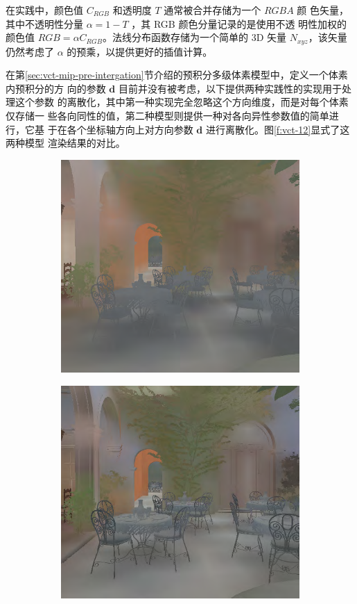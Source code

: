 在实践中，颜色值 $C_{RGB}$ 和透明度 $T$ 通常被合并存储为一个 $RGBA$ 颜 色矢量，其中不透明性分量 $\alpha = 1 − T$ ，其 RGB 颜色分量记录的是使用不透 明性加权的颜色值 $RGB =\alpha C_{RGB}$。法线分布函数存储为一个简单的 3D 矢量 $N_{xyz}$，该矢量仍然考虑了 $\alpha$ 的预乘，以提供更好的插值计算。

在第\ref{sec:vct-mip-pre-intergation}节介绍的预积分多级体素模型中，定义一个体素内预积分的方 向的参数 $\mathbf{d}$ 目前并没有被考虑，以下提供两种实践性的实现用于处理这个参数 的离散化，其中第一种实现完全忽略这个方向维度，而是对每个体素仅存储一 些各向同性的值，第二种模型则提供一种对各向异性参数值的简单进行，它基 于在各个坐标轴方向上对方向参数 $\mathbf{d}$ 进行离散化。图\ref{f:vct-12}显式了这两种模型 渲染结果的对比。

\begin{figure}
	\begin{subfigure}[b]{0.5\textwidth}
		\includegraphics[width=\textwidth]{figures/vct/vct-12-1}
		\caption{}
	\end{subfigure}
	\begin{subfigure}[b]{0.5\textwidth}
		\includegraphics[width=\textwidth]{figures/vct/vct-12-2}

\end{subfigure}
\end{figure}
